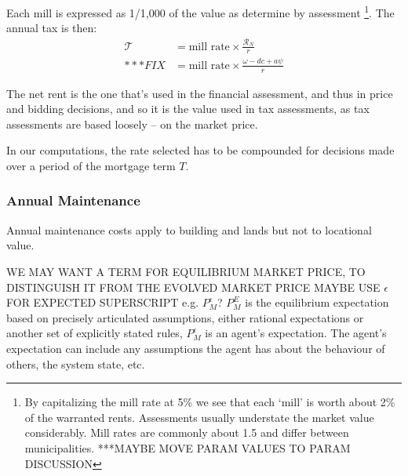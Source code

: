 Each mill is expressed as  1/1,000 of the value as determine by assessment \footnote{By capitalizing the mill rate at 5\%  we see that each `mill' is worth about 2\% of the warranted rents. Assessments usually understate the market value considerably. Mill rates are commonly about 1.5 and differ between municipalities. ***MAYBE MOVE PARAM VALUES TO PARAM DISCUSSION}. The annual tax is then:
\begin{align*}
\mathcal{T} &= \text{mill rate} \times \frac{\mathcal{R}_N}{r} \\
 *** FIX &= \text{mill rate} \times \frac{\omega- {dc} + a\psi}{r}
\end{align*}

The net rent is the one that's used in the financial assessment, and thus in price and bidding decisions, and so it is the value used in tax assessments, as tax assessments are based loosely -- on the market price. 

In our computations, the rate selected has to be compounded for decisions made over a period of the mortgage term $T$.

\subsubsection{Annual Maintenance}
Annual maintenance costs apply to building and lands but not to locational value.

WE MAY  WANT A TERM FOR EQUILIBRIUM MARKET PRICE, TO DISTINGUISH IT FROM THE EVOLVED MARKET PRICE  %
MAYBE USE $\epsilon$ FOR EXPECTED SUPERSCRIPT e.g. $P_M^{\epsilon}$? %
 $P_M^{E}$ is the equilibrium expectation based on precisely articulated assumptions, either rational expectations or another set of explicitly stated rules,  $P_M^{\epsilon}$ is an agent's expectation. The agent's expectation can include any assumptions the agent has about the behaviour of others, the system state, etc. %

